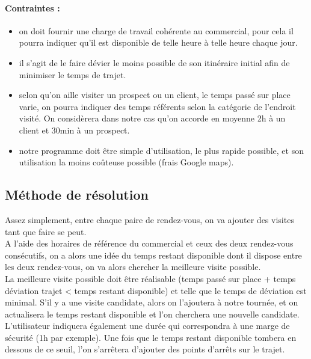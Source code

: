 \documentclass[12pt]{article}
\begin{document}
\paragraph{Contraintes :}
\begin{itemize}
\item on doit fournir une charge de travail cohérente au commercial, pour cela il pourra indiquer qu'il est disponible de telle heure à telle heure chaque jour.
\item il s'agit de le faire dévier le moins possible de son itinéraire initial afin de minimiser le temps de trajet.
\item selon qu'on aille visiter un prospect ou un client, le temps passé sur place varie, on pourra indiquer des temps référents selon la catégorie de l'endroit visité. On considèrera dans notre cas qu'on accorde en moyenne 2h à un client et 30min à un prospect.
\item notre programme doit être simple d'utilisation, le plus rapide possible, et son utilisation la moins coûteuse possible (frais Google maps).
\end{itemize}

\subsection{Méthode de résolution}

Assez simplement, entre chaque paire de rendez-vous, on va ajouter des visites tant que faire se peut.\\
A l'aide des horaires de référence du commercial et ceux des deux rendez-vous consécutifs, on a alors une idée du temps restant disponible dont il dispose entre les deux rendez-vous, on va alors chercher la meilleure visite possible.\\

La meilleure visite possible doit être réalisable (temps passé sur place + temps déviation trajet < temps restant disponible) et telle que le temps de déviation est minimal. S'il y a une visite candidate, alors on l'ajoutera à notre tournée, et on actualisera le temps restant disponible et l'on cherchera une nouvelle candidate.\\

L'utilisateur indiquera également une durée qui correspondra à une marge de sécurité (1h par exemple). Une fois que le temps restant disponible tombera en dessous de ce seuil, l'on s'arrêtera d'ajouter des points d'arrêts sur le trajet.\\
\end{document}

